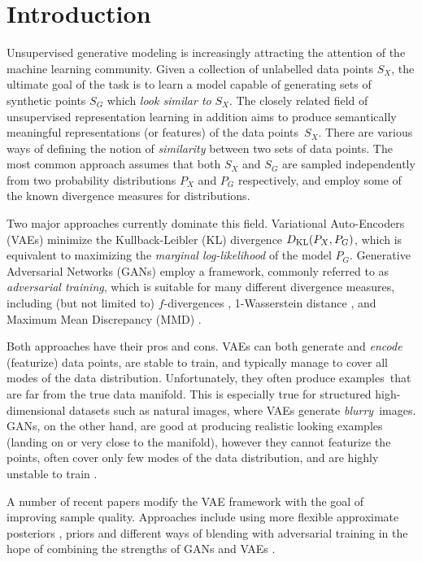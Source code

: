 \section{Introduction}
Unsupervised generative modeling is increasingly attracting the attention of the machine learning community.
Given a collection of unlabelled data points $S_X$, the ultimate goal of the task is to learn a model capable of generating sets of synthetic points $S_G$ which \emph{look similar to} $S_X$.
The closely related field of unsupervised representation learning in addition aims to produce semantically meaningful representations (or features) of the data points~$S_X$.
There are various ways of defining the notion of \emph{similarity} between two sets of data points.
The most common approach assumes that both $S_X$ and $S_G$ are sampled independently from two probability distributions $P_X$ and $P_G$ respectively, and employ some of the known divergence measures for distributions.

Two major approaches currently dominate this field.
Variational Auto-Encoders (VAEs) \citep{KW14, rezende2014stochastic} minimize the Kullback-Leibler (KL) divergence $D_{\mathrm{KL}}(P_X, P_G)$, which is equivalent to maximizing the \emph{marginal log-likelihood} of the model $P_G$.
Generative Adversarial Networks (GANs) \citep{goodfellow2014generative} employ a framework, commonly referred to as \emph{adversarial training}, which is suitable for many different divergence measures, including (but not limited to) $f$-divergences \citep{nowozin2016f}, 1-Wasserstein distance \citep{AB17}, and Maximum Mean Discrepancy (MMD) \citep{dziugaite2015training, li2017mmd, BS+18}.

Both approaches have their pros and cons. 
VAEs can both generate and \emph{encode} (featurize) data points, are stable to train, and typically manage to cover all modes of the data distribution.
Unfortunately, they often produce examples~that are far from the true data manifold.
This is especially true for structured high-dimensional datasets such as natural images, where VAEs generate \emph{blurry}~images.
GANs, on the other hand, are good at producing realistic looking examples (landing on or very close to the manifold), however they cannot featurize the points, often cover only few modes of the data distribution, and are highly unstable to train \citep{salimans2016improved}.

A number of recent papers modify the VAE framework with the goal of improving sample quality. Approaches include using more flexible approximate posteriors \citep{kingma2016improved}, priors \citep{tomczak2017vae} and different ways of blending with adversarial training in the hope of combining the strengths of GANs and VAEs \citep{larsen2015autoencoding, MSJ+16, MNG17}.

